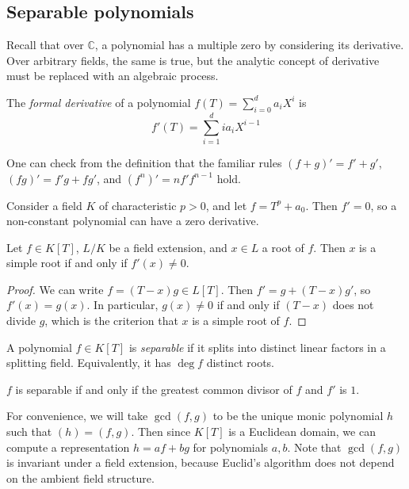 \subsection{Separable polynomials}
Recall that over \( \mathbb C \), a polynomial has a multiple zero by considering its derivative.
Over arbitrary fields, the same is true, but the analytic concept of derivative must be replaced with an algebraic process.
\begin{definition}
	The \emph{formal derivative} of a polynomial \( f(T) = \sum_{i=0}^d a_i X^i \) is
	\[ f'(T) = \sum_{i=1}^d i a_i X^{i-1} \]
\end{definition}
\begin{remark}
	One can check from the definition that the familiar rules \( (f + g)' = f' + g' \), \( (fg)' = f'g + fg' \), and \( (f^n)' = nf'f^{n-1} \) hold.
\end{remark}
\begin{example}
	Consider a field \( K \) of characteristic \( p > 0 \), and let \( f = T^p + a_0 \).
	Then \( f' = 0 \), so a non-constant polynomial can have a zero derivative.
\end{example}
\begin{proposition}
	Let \( f \in K[T] \), \( L / K \) be a field extension, and \( x \in L \) a root of \( f \).
	Then \( x \) is a simple root if and only if \( f'(x) \neq 0 \).
\end{proposition}
\begin{proof}
	We can write \( f = (T-x)g \in L[T] \).
	Then \( f' = g + (T-x)g' \), so \( f'(x) = g(x) \).
	In particular, \( g(x) \neq 0 \) if and only if \( (T-x) \) does not divide \( g \), which is the criterion that \( x \) is a simple root of \( f \).
\end{proof}
\begin{definition}
	A polynomial \( f \in K[T] \) is \emph{separable} if it splits into distinct linear factors in a splitting field.
	Equivalently, it has \( \deg f \) distinct roots.
\end{definition}
\begin{corollary}
	\( f \) is separable if and only if the greatest common divisor of \( f \) and \( f' \) is \( 1 \).
\end{corollary}
For convenience, we will take \( \gcd(f, g) \) to be the unique monic polynomial \( h \) such that \( (h) = (f, g) \).
Then since \( K[T] \) is a Euclidean domain, we can compute a representation \( h = af + bg \) for polynomials \( a, b \).
Note that \( \gcd(f, g) \) is invariant under a field extension, because Euclid's algorithm does not depend on the ambient field structure.
